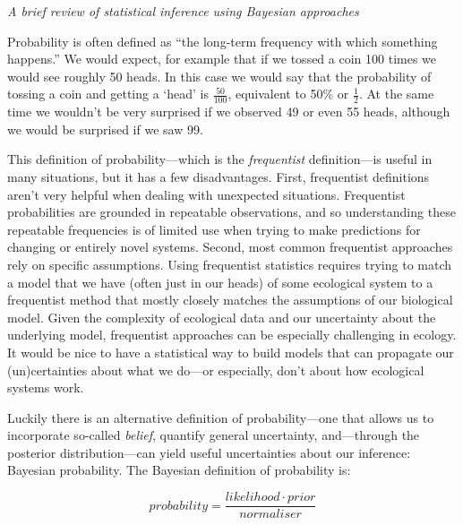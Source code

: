 \documentclass[11pt]{article}
\begin{document}
{\emph{A brief review of statistical inference using Bayesian approaches}

Probability is often defined as ``the long-term frequency with which something happens.'' We would expect, for example that if we tossed a coin 100 times we would see roughly 50 heads.  In this case we would say that the probability of tossing a coin and getting a `head' is $\frac{50}{100}$, equivalent to 50\% or $\frac{1}{2}$. At the same time we wouldn’t be very surprised if we observed 49 or even 55 heads, although we would be surprised if we saw 99.

This definition of probability---which is the \emph{frequentist} definition---is useful in many situations, but it has a few disadvantages. First, frequentist definitions aren't very helpful when dealing with unexpected situations. Frequentist probabilities are grounded in repeatable observations, and so understanding these repeatable frequencies is of limited use when trying to make predictions for changing or entirely novel systems. Second, most common frequentist approaches rely on specific assumptions. Using frequentist statistics requires trying to match a model that we have (often just in our heads) of some ecological system  to a frequentist method that mostly closely matches the assumptions of our biological model. Given the complexity of ecological data and our uncertainty about the underlying model, frequentist approaches can be especially challenging in ecology. It would be nice to have a statistical way to build models that can propagate our (un)certainties about what we do---or especially, don't about how ecological systems work. %

Luckily there is an alternative definition of probability---one that allows us to incorporate so-called \emph{belief}, quantify general uncertainty, and---through the posterior distribution---can yield useful uncertainties about our inference: Bayesian probability. The Bayesian definition of probability is:

\begin{equation}
  probability = \frac{likelihood \cdot prior}{normaliser}
  \label{bayes_theorem}
\end{equation}

}
\end{document}
